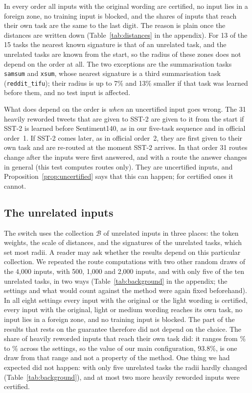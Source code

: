 In every order all inputs with the original wording are certified, no input lies in a foreign
zone, no training input is blocked, and the shares of inputs that reach their own task are the
same to the last digit. The reason is plain once the distances are written down
(Table~\ref{tab:distances} in the appendix). For 13 of the 15 tasks the nearest known signature is
that of an unrelated task, and the unrelated tasks are known from the start, so the radius of
these zones does not depend on the order at all. The two exceptions are the summarisation tasks
\texttt{samsum} and \texttt{xsum}, whose nearest signature is a third summarisation task
(\texttt{reddit\_tifu}); their radius is up to 7\% and 13\% smaller if that task was learned
before them, and no test input is affected.

What does depend on the order is \emph{when} an uncertified input goes wrong. The 31 heavily
reworded tweets that are given to SST-2 are given to it from the start if SST-2 is learned before
Sentiment140, as in our five-task sequence and in official order~1. If SST-2 comes later, as in
official order~2, they are first given to their own task and are re-routed at the moment SST-2
arrives. In that order 31 routes change after the inputs were first answered, and with a route the answer
changes in general (this test computes routes only). They are uncertified inputs, and
Proposition~\ref{prop:uncertified} says that this can happen; for certified ones it cannot.


\subsection{The unrelated inputs}
\label{sec:background}

The switch uses the collection $\mathcal{B}$ of unrelated inputs in three places: the token
weights, the scale of distances, and the signatures of the unrelated tasks, which set most radii.
A reader may ask whether the results depend on this particular collection. We repeated the route
computations with two other random draws of the 4{,}000 inputs, with 500, 1{,}000 and 2{,}000 inputs,
and with only five of the ten unrelated tasks, in two ways (Table~\ref{tab:background} in the
appendix; the settings and what would count against the method were again fixed beforehand). In
all eight settings every input with the original or the light wording is certified, every input
with the original, light or medium wording reaches its own task, no input lies in a foreign zone,
and no training input is blocked. The part of the results that rests on the guarantee therefore
did not depend on the choice. The share of heavily reworded inputs that reach their own task did:
it ranges from \BackgroundHeavyLow{}\% to \BackgroundHeavyHigh{}\% across the settings, so the value
of our main configuration, 93.8\%, is one draw from that range and not a property of the method.
One thing we had expected did not happen: with only five unrelated tasks the radii hardly changed (Table~\ref{tab:background}),
and at most two more heavily reworded inputs were certified.


